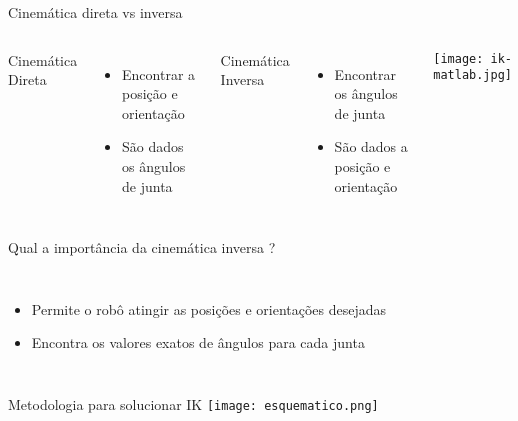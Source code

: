 \begin{frame}[c]{Cinemática direta vs inversa}
    \begin{columns}
        Cinemática Direta
        \begin{itemize}
            \item Encontrar a posição e orientação
            \item São dados os ângulos de junta
        \end{itemize}
        Cinemática Inversa
        \begin{itemize}
            \item Encontrar os ângulos de junta
            \item São dados a posição e orientação
        \end{itemize}
            \centering
            \texttt{[image: ik-matlab.jpg]}
    \end{columns}
\end{frame}
\begin{frame}[c]{Qual a importância da cinemática inversa ?}
    \begin{columns}
        \begin{itemize}
            \item Permite o robô atingir as posições e orientações desejadas
            \item Encontra os valores exatos de ângulos para cada junta
        \end{itemize}
            \centering
            \begin{figure}
            \end{figure}
    \end{columns}
\end{frame}
\begin{frame}[c]{Metodologia para solucionar IK}
    \centering
    \texttt{[image: esquematico.png]}
\end{frame}
